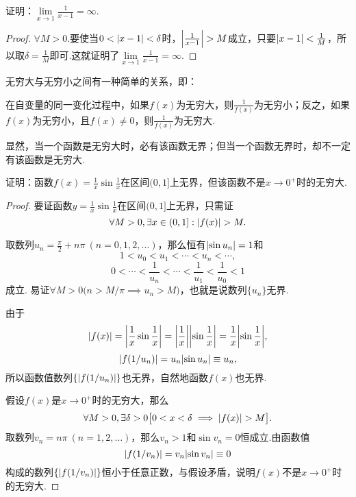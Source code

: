 \begin{example}
证明：\(\lim\limits_{x\to1}\frac{1}{x-1}=\infty\).
\begin{proof}
\(\forall M>0\).要使当\(0<\abs{x-1}<\delta\)时，\(\abs{\frac{1}{x-1}}>M\)成立，只要\(\abs{x-1}<\frac{1}{M}\)，所以取\(\delta=\frac{1}{M}\)即可.这就证明了\(\lim\limits_{x\to1}\frac{1}{x-1}=\infty\).
\end{proof}
\end{example}

无穷大与无穷小之间有一种简单的关系，即：
\begin{theorem}\label{theorem:极限.无穷大与无穷小的关系}
在自变量的同一变化过程中，如果\(f(x)\)为无穷大，则\(\frac{1}{f(x)}\)为无穷小；反之，如果\(f(x)\)为无穷小，且\(f(x) \neq 0\)，则\(\frac{1}{f(x)}\)为无穷大.
\end{theorem}

显然，当一个函数是无穷大时，必有该函数无界；但当一个函数无界时，却不一定有该函数是无穷大.
\begin{example}
证明：函数\(f(x) = \frac{1}{x} \sin\frac{1}{x}\)在区间\((0,1]\)上无界，但该函数不是\(x\to0^+\)时的无穷大.
\begin{proof}
要证函数\(y = \frac{1}{x} \sin\frac{1}{x}\)在区间\((0,1]\)上无界，只需证\[
\forall M > 0, \exists x \in (0,1] : \abs{f(x)} > M.
\]

取数列\(u_n = \frac{\pi}{2} + n\pi\ (n=0,1,2,\dotsc)\)，那么恒有\(\abs{\sin u_n} = 1\)和\[
1 < u_0 < u_1 < \dotsb < u_n < \dotsb,
\]\[
0 < \dotsb < \frac{1}{u_n} < \dotsb < \frac{1}{u_1} < \frac{1}{u_0} < 1
\]成立.
易证\(
\forall M > 0 \bigl(
	n > M/\pi \implies u_n > M
\bigr)
\)，也就是说数列\(\{u_n\}\)无界.

由于\[
\abs{f(x)} = \abs{\frac{1}{x} \sin\frac{1}{x}}
= \abs{\frac{1}{x}} \abs{\sin\frac{1}{x}}
= \frac{1}{x} \abs{\sin\frac{1}{x}},
\]\[
\abs{f(1/u_n)}
= u_n \abs{\sin u_n} \equiv u_n,
\]所以函数值数列\(\{\abs{f(1/u_n)}\}\)也无界，自然地函数\(f(x)\)也无界.


假设\(f(x)\)是\(x\to0^+\)时的无穷大，那么\[
\forall M > 0, \exists \delta > 0 \bigl[
0 < x < \delta \implies \abs{f(x)} > M
\bigr].
\]取数列\(v_n = n\pi\ (n=1,2,\dotsc)\)，那么\(v_n > 1\)和\(\sin v_n = 0\)恒成立.由函数值\[
\abs{f(1/v_n)} = v_n \abs{\sin v_n} \equiv 0
\]构成的数列\(\{\abs{f(1/v_n)}\}\)恒小于任意正数，与假设矛盾，说明\(f(x)\)不是\(x\to0^+\)时的无穷大.
\end{proof}
\end{example}

